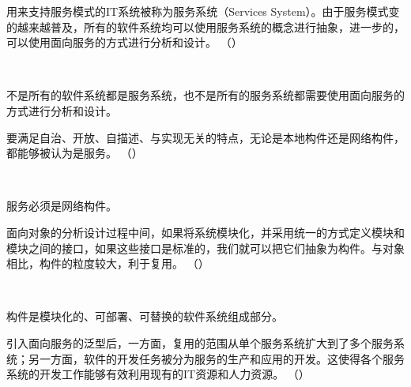 \begin{problem}
	用来支持服务模式的IT系统被称为服务系统（Services System）。由于服务模式变的越来越普及，所有的软件系统均可以使用服务系统的概念进行抽象，进一步的，可以使用面向服务的方式进行分析和设计。
	\hfill （）
\end{problem}
\\ \begin{solution}
	不是所有的软件系统都是服务系统，也不是所有的服务系统都需要使用面向服务的方式进行分析和设计。
\end{solution}


\begin{problem}
	要满足自治、开放、自描述、与实现无关的特点，无论是本地构件还是网络构件，都能够被认为是服务。
	\hfill （）
\end{problem}
\\ \begin{solution}
服务必须是网络构件。
\end{solution}


\begin{problem}
	面向对象的分析设计过程中间，如果将系统模块化，并采用统一的方式定义模块和模块之间的接口，如果这些接口是标准的，我们就可以把它们抽象为构件。与对象相比，构件的粒度较大，利于复用。
	\hfill （）
\end{problem}
\\ \begin{solution}
	构件是模块化的、可部署、可替换的软件系统组成部分。
\end{solution}


\begin{problem}
	引入面向服务的泛型后，一方面，复用的范围从单个服务系统扩大到了多个服务系统；另一方面，软件的开发任务被分为服务的生产和应用的开发。这使得各个服务系统的开发工作能够有效利用现有的IT资源和人力资源。
	\hfill （）
\end{problem}



